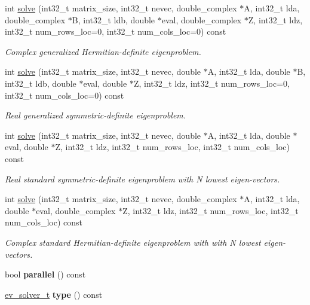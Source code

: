 \begin{DoxyCompactItemize}
\item 
int \hyperlink{class_eigenproblem__elpa1_a9c4d7a9954031c8d5d9fd96d5ecb8c72}{solve} (int32\+\_\+t matrix\+\_\+size, int32\+\_\+t nevec, double\+\_\+complex $\ast$A, int32\+\_\+t lda, double\+\_\+complex $\ast$B, int32\+\_\+t ldb, double $\ast$eval, double\+\_\+complex $\ast$Z, int32\+\_\+t ldz, int32\+\_\+t num\+\_\+rows\+\_\+loc=0, int32\+\_\+t num\+\_\+cols\+\_\+loc=0) const 
\begin{DoxyCompactList}\small\item\em Complex generalized Hermitian-\/definite eigenproblem. \end{DoxyCompactList}\item 
int \hyperlink{class_eigenproblem__elpa1_a81947ff14335579c6774d2ef26cdd22a}{solve} (int32\+\_\+t matrix\+\_\+size, int32\+\_\+t nevec, double $\ast$A, int32\+\_\+t lda, double $\ast$B, int32\+\_\+t ldb, double $\ast$eval, double $\ast$Z, int32\+\_\+t ldz, int32\+\_\+t num\+\_\+rows\+\_\+loc=0, int32\+\_\+t num\+\_\+cols\+\_\+loc=0) const 
\begin{DoxyCompactList}\small\item\em Real generalized symmetric-\/definite eigenproblem. \end{DoxyCompactList}\item 
int \hyperlink{class_eigenproblem__elpa1_a8ce3f612a3cc4eddc96923a3484489fd}{solve} (int32\+\_\+t matrix\+\_\+size, int32\+\_\+t nevec, double $\ast$A, int32\+\_\+t lda, double $\ast$eval, double $\ast$Z, int32\+\_\+t ldz, int32\+\_\+t num\+\_\+rows\+\_\+loc, int32\+\_\+t num\+\_\+cols\+\_\+loc) const 
\begin{DoxyCompactList}\small\item\em Real standard symmetric-\/definite eigenproblem with N lowest eigen-\/vectors. \end{DoxyCompactList}\item 
int \hyperlink{class_eigenproblem__elpa1_aa7d78314867a58639f127f141499f26f}{solve} (int32\+\_\+t matrix\+\_\+size, int32\+\_\+t nevec, double\+\_\+complex $\ast$A, int32\+\_\+t lda, double $\ast$eval, double\+\_\+complex $\ast$Z, int32\+\_\+t ldz, int32\+\_\+t num\+\_\+rows\+\_\+loc, int32\+\_\+t num\+\_\+cols\+\_\+loc) const 
\begin{DoxyCompactList}\small\item\em Complex standard Hermitian-\/definite eigenproblem with with N lowest eigen-\/vectors. \end{DoxyCompactList}\item 
\hypertarget{class_eigenproblem__elpa1_ae7db7048a876855e6f91e66b3d04d72f}{}bool {\bfseries parallel} () const \label{class_eigenproblem__elpa1_ae7db7048a876855e6f91e66b3d04d72f}

\item 
\hypertarget{class_eigenproblem__elpa1_a4798835ca632054a6c1ee0c66c880da8}{}\hyperlink{eigenproblem_8h_a203f2c57422a6e64834e6e9ab85982bf}{ev\+\_\+solver\+\_\+t} {\bfseries type} () const \label{class_eigenproblem__elpa1_a4798835ca632054a6c1ee0c66c880da8}

\end{DoxyCompactItemize}

